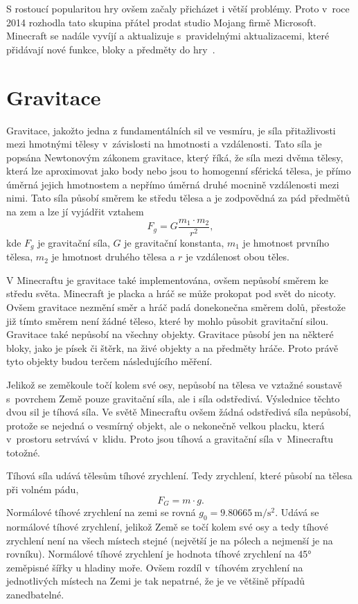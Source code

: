 \documentclass[a4paper, twoside]{article}
\begin{document}
S rostoucí popularitou hry ovšem začaly přicházet i větší problémy. Proto v~roce 2014 rozhodla tato skupina přátel prodat studio Mojang firmě Microsoft. Minecraft se nadále vyvíjí a aktualizuje s~pravidelnými aktualizacemi, které přidávají nové funkce, bloky a předměty do hry~\cite{minecraft-historie}.

\section{Gravitace}
Gravitace, jakožto jedna z fundamentálních sil ve vesmíru, je síla přitažlivosti mezi hmotnými tělesy v~závislosti na hmotnosti a vzdálenosti. Tato síla je popsána Newtonovým zákonem gravitace, který říká, že síla mezi dvěma tělesy, která lze aproximovat jako body nebo jsou to homogenní sférická tělesa, je přímo úměrná jejich hmotnostem a nepřímo úměrná druhé mocnině vzdálenosti mezi nimi. Tato síla působí směrem ke středu tělesa a je zodpovědná za pád předmětů na zem a lze jí vyjádřit vztahem~\cite{newtonuv-gravitacni-zakon}
$$F_g = G\frac{m_1\cdot m_2}{r^2},$$
kde $F_g$ je gravitační síla,  $G$ je gravitační konstanta, $m_1$ je hmotnost prvního tělesa, $m_2$ je hmotnost druhého tělesa a $r$ je vzdálenost obou těles.

V Minecraftu je gravitace také implementována, ovšem nepůsobí směrem ke středu světa. Minecraft je placka a hráč se může prokopat pod svět do nicoty. Ovšem gravitace nezmění směr a hráč padá donekonečna směrem dolů, přestože již tímto směrem není žádné těleso, které by mohlo působit gravitační silou. Gravitace také nepůsobí na všechny objekty. Gravitace působí jen na některé bloky, jako je písek či štěrk, na živé objekty a na předměty hráče. Proto právě tyto objekty budou terčem následujícího měření.

Jelikož se zeměkoule točí kolem své osy, nepůsobí na tělesa ve vztažné soustavě s~povrchem Země pouze gravitační síla, ale i síla odstředivá. Výslednice těchto dvou sil je tíhová síla. Ve světě Minecraftu ovšem žádná odstředivá síla nepůsobí, protože se nejedná o vesmírný objekt, ale o nekonečně velkou placku, která v~prostoru setrvává v~klidu. Proto jsou tíhová a gravitační síla v~Minecraftu totožné. 

Tíhová síla udává tělesům tíhové zrychlení. Tedy zrychlení, které působí na tělesa při volném pádu,
$$F_G = m\cdot g.$$
Normálové tíhové zrychlení na zemi se rovná $g_0= \SI{9,80665}{\meter\per\second\squared}$. Udává se normálové tíhové zrychlení, jelikož Země se točí kolem své osy a tedy tíhové zrychlení není na všech místech stejné (největší je na pólech a nejmenší je na rovníku). Normálové tíhové zrychlení je hodnota tíhové zrychlení na 45° zeměpisné šířky u hladiny moře. Ovšem rozdíl v~tíhovém zrychlení na jednotlivých místech na Zemi je tak nepatrné, že je ve většině případů zanedbatelné. 
\end{document}
